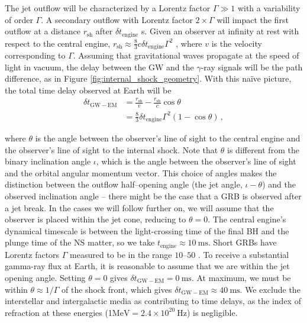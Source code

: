 The jet outflow will be characterized by a Lorentz factor $\Gamma \gg 1$ with a variability of order $\Gamma$. A secondary outflow with Lorentz factor $2 \times \Gamma$ will impact the first outflow at a distance $r_\mathrm{sh}$ after $\delta t_\mathrm{engine}$ s. Given an observer at infinity at rest with respect to the central engine, $r_\mathrm{sh} \approx \frac{8}{3} c \delta t_\mathrm{engine} \Gamma^2$ \cite{NickThesis}, where $v$ is the velocity corresponding to $\Gamma$. Assuming that gravitational waves propagate at the speed of light in vacuum, the delay between the GW and the $\gamma$-ray signals will be the path difference, as in Figure \ref{fig:internal_shock_geometry}. With this na\"ive picture, the total time delay observed at Earth will be
%
\begin{align}
\label{eq:time_delay}
  \delta t_\mathrm{GW-EM}
      &=  \frac{r_\mathrm{sh}}{v} - \frac{r_\mathrm{sh}}{c} \cos \theta
          \nonumber\\
      &=  \frac{8}{3} \delta t_\mathrm{engine} \Gamma^2
          \left(1 - \cos \theta\right) \,,
\end{align}

\noindent where $\theta$ is the angle between the observer's line of sight to the central engine and the observer's line of sight to the internal shock. Note that $\theta$ is different from the binary inclination angle $\iota$, which is the angle between the observer's line of sight and the orbital angular momentum vector. This choice of angles makes the distinction between the outflow half--opening angle (the jet angle, $\iota - \theta$) and the observed inclination angle -- there might be the case that a GRB is observed after a jet break. In the cases we will follow further on, we will assume that the observer is placed within the jet cone, reducing to $\theta=0$. The central engine's dynamical timescale is between the light-crossing time of the final BH and the plunge time of the NS matter, so we take $t_\mathrm{engine} \approx 10~\mathrm{ms}$. Short GRBs have Lorentz factors $\Gamma$ measured to be in the range $10$--$50$ \cite{NakarReview:2007}. To receive a substantial gamma-ray flux at Earth, it is reasonable to assume that we are within the jet opening angle. Setting $\theta = 0$ gives $\delta t_\mathrm{GW-EM} = 0~\textrm{ms}$. At maximum, we must be within $\theta \approx 1 / \Gamma$ of the shock front, which gives $\delta t_\mathrm{GW-EM} \approx 40~\textrm{ms}$. We exclude the interstellar and intergalactic media as contributing to time delays, as the index of refraction at these energies (1$\mathrm{MeV} = 2.4 \times 10^{20}~\mathrm{Hz}$) is negligible.

